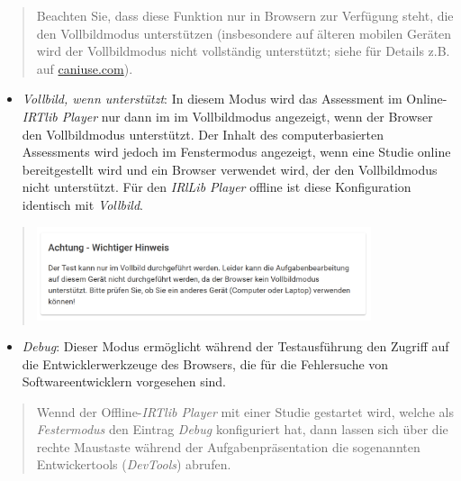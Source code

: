 \documentclass[
  letterpaper,
  DIV=11]{scrreprt}
\providecommand{\tightlist}{%
  \setlength{\itemsep}{0pt}\setlength{\parskip}{0pt}}\usepackage{longtable,booktabs,array}
\begin{document}
\begin{tcolorbox}
\begin{quote}
Beachten Sie, dass diese Funktion nur in Browsern zur Verfügung steht,
die den Vollbildmodus unterstützen (insbesondere auf älteren mobilen
Geräten wird der Vollbildmodus nicht vollständig unterstützt; siehe für
Details z.B. auf
\href{https://caniuse.com/?search=fullscreen}{caniuse.com}).
\end{quote}

\begin{itemize}
\tightlist
\item
  \emph{Vollbild, wenn unterstützt}: In diesem Modus wird das Assessment
  im Online-\emph{IRTlib Player} nur dann im im Vollbildmodus angezeigt,
  wenn der Browser den Vollbildmodus unterstützt. Der Inhalt des
  computerbasierten Assessments wird jedoch im Fenstermodus angezeigt,
  wenn eine Studie online bereitgestellt wird und ein Browser verwendet
  wird, der den Vollbildmodus nicht unterstützt. Für den \emph{IRlLib
  Player} offline ist diese Konfiguration identisch mit \emph{Vollbild}.
\end{itemize}

\begin{quote}
\includegraphics[width=0.8\textwidth,height=\textheight]{img/screenshot-irtlib-player-message-fullscreen-not-supported-DEU.png}
\end{quote}

\begin{itemize}
\tightlist
\item
  \emph{Debug}: Dieser Modus ermöglicht während der Testausführung den
  Zugriff auf die Entwicklerwerkzeuge des Browsers, die für die
  Fehlersuche von Softwareentwicklern vorgesehen sind.
\end{itemize}

\begin{quote}
Wennd der Offline-\emph{IRTlib Player} mit einer Studie gestartet wird,
welche als \emph{Festermodus} den Eintrag \emph{Debug} konfiguriert hat,
dann lassen sich über die rechte Maustaste während der
Aufgabenpräsentation die sogenannten Entwickertools (\emph{DevTools})
abrufen.
\end{quote}


\end{tcolorbox}
\end{document}
